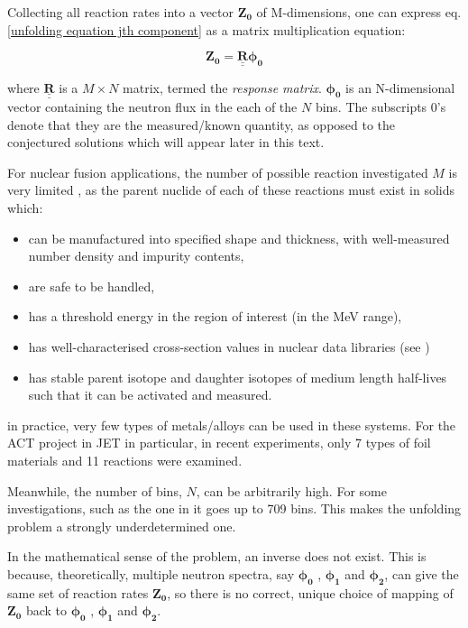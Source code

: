 \documentclass[a4paper, 12pt]{article}
\newcommand{\matr}[1]{\underline{\underline{\textbf{#1}}}}
\newcommand{\ve}[1]{\boldsymbol{#1}}
\begin{document}
Collecting all reaction rates into a vector $\ve{Z_0}$ of M-dimensions, one can express eq. \ref{unfolding equation jth component} as a matrix multiplication equation:
    
\begin{equation} \label{unfolding general equation}
\ve{Z_0}=\matr{R} \ve{\phi_0}
\end{equation}

where $\matr{R}$ is a $M\times N$ matrix, termed the \emph{response matrix}. $\ve{\phi_0}$ is an N-dimensional vector containing the neutron flux in the each of the $N$ bins. The subscripts 0's denote that they are the measured/known quantity, as opposed to the conjectured solutions which will appear later in this text.

For nuclear fusion applications, the number of possible reaction investigated $M$ is very limited \cite{MaterialSelection}, as the parent nuclide of each of these reactions must exist in solids which:
\begin{itemize}
    \item can be manufactured into specified shape and thickness, with well-measured number density and impurity contents,
    \item are safe to be handled,
    \item has a threshold energy in the region of interest (in the MeV range),
    \item has well-characterised cross-section values in nuclear data libraries (see \cite{MaterialSelectionASTM})
    \item has stable parent isotope and daughter isotopes of medium length half-lives such that it can be activated and measured.
\end{itemize}
in practice, very few types of metals/alloys can be used in these systems. For the ACT project in JET in particular, in recent experiments, only 7 types of foil materials and 11 reactions were examined. \cite{LWP_LTIS}

Meanwhile, the number of bins, $N$, can be arbitrarily high. For some investigations, such as the one in \cite{EmbargoPaper_LWP} it goes up to 709 bins. 
This makes the unfolding problem a strongly underdetermined one.

In the mathematical sense of the problem, an inverse does not exist. This is because, theoretically, multiple neutron spectra, say $\ve{\phi_0}$ , $\ve{\phi_1}$ and $\ve{\phi_2}$, can give the same set of reaction rates $\ve{Z_0}$, so there is no correct, unique choice of mapping of $\ve{Z_0}$ back to $\ve{\phi_0}$ , $\ve{\phi_1}$ and $\ve{\phi_2}$. 
\end{document}

